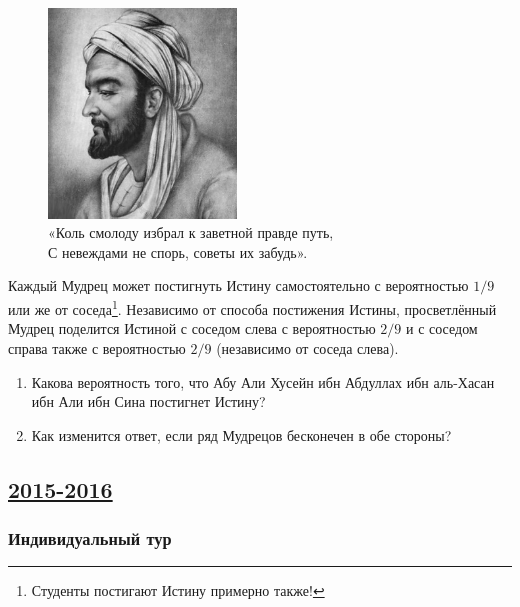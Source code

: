 \begin{enumerate}
\begin{figure}[h!]
  \begin{center}
\includegraphics[width=5cm]{images/abu_ali.jpg}
  \caption*{«Коль смолоду избрал к заветной правде путь, \\
 С невеждами не спорь, советы их забудь». }
 \end{center}
\end{figure}

Каждый Мудрец может постигнуть Истину самостоятельно с вероятностью $1/9$
или же от соседа\footnote{Студенты постигают Истину примерно также!}. Независимо
от способа постижения Истины, просветлённый Мудрец поделится Истиной с соседом
слева с вероятностью $2/9$ и с соседом справа также с вероятностью $2/9$ (независимо
от соседа слева).
\begin{enumerate}
\item Какова вероятность того, что Абу Али Хусейн ибн Абдуллах ибн аль-Хасан ибн
Али ибн Сина постигнет Истину?
\item Как изменится ответ, если ряд Мудрецов бесконечен в обе стороны?
\end{enumerate}
\end{enumerate}



\newpage
\subsection[2015-2016]{\hyperref[sec:sol_kr_01_ip_2015_2016]{2015-2016}}
\label{sec:kr_01_ip_2015_2016}

\subsubsection*{Индивидуальный тур}

